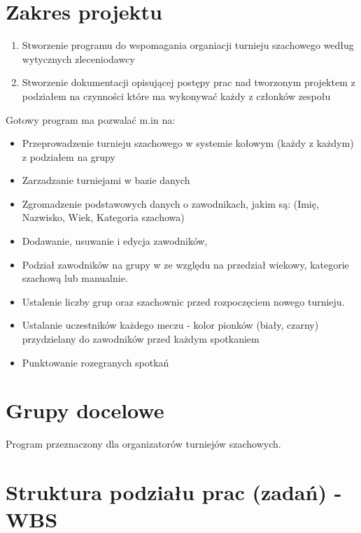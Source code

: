 \section{Zakres projektu}
\begin{enumerate}
	\item Stworzenie programu do wspomagania organiacji turnieju szachowego według wytycznych zleceniodawcy
	\item Stworzenie dokumentacji opisującej postępy prac nad tworzonym projektem z podziałem na czynności które ma wykonywać każdy z członków zespołu
\end{enumerate}
Gotowy program ma pozwalać m.in na:
\begin{itemize}
	\item Przeprowadzenie turnieju szachowego w systemie kołowym (każdy z każdym) z podziałem na grupy
	\item Zarzadzanie turniejami w bazie danych 
	\item Zgromadzenie podstawowych danych o zawodnikach, jakim są: (Imię, Nazwisko, Wiek, Kategoria szachowa) 
	\item Dodawanie, usuwanie i edycja zawodników, 
	\item Podział zawodników na grupy w ze względu na przedział wiekowy, kategorie szachową lub manualnie. 
	\item Ustalenie liczby grup oraz szachownic przed rozpoczęciem nowego turnieju. 
	\item Ustalanie uczestników każdego meczu - kolor pionków (biały, czarny) przydzielany do zawodników przed każdym spotkaniem 
	\item Punktowanie rozegranych spotkań
\end{itemize}


\section{Grupy docelowe}
Program przeznaczony dla organizatorów turniejów szachowych.  


\section{Struktura podziału prac (zadań) - WBS}

